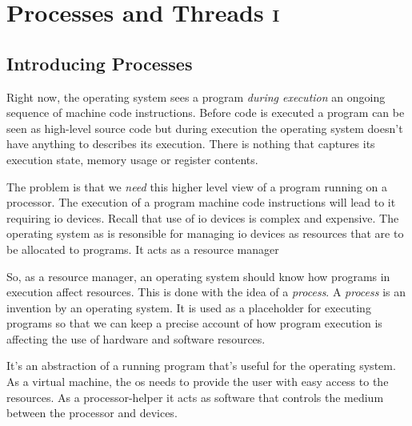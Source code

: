 
\chapter{Processes and Threads \textsc{i}}





\section{Introducing Processes}


Right now, the operating system sees a program \textit{during execution} 
an ongoing sequence of machine code instructions. Before code is executed 
a program can be seen as high-level source code but during 
execution the operating system doesn't have anything to describes its execution. 
There is nothing that captures its execution state, memory usage or register contents. 

The problem is that we \textit{need} this higher level view of a program running on a processor.
The execution of a program machine code instructions will lead to it requiring io devices.
Recall that use of io devices is complex and expensive. 
The operating system as is resonsible for managing io devices as resources that 
are to be allocated to programs. It acts as a resource manager

So, as a resource manager, an operating system should know how programs in 
execution affect resources. This is done with the idea of a \textit{process}. 
A \textit{process} is an invention by an operating system. 
It is used as a placeholder for executing programs so that we can keep a precise 
account of how program execution is affecting the use of hardware and software resources.


It's an abstraction of a running program that's useful for the operating system.
As a virtual machine, the os needs to provide the user with easy access to the 
resources. As a processor-helper it acts as software that controls the
medium between the processor and devices.


